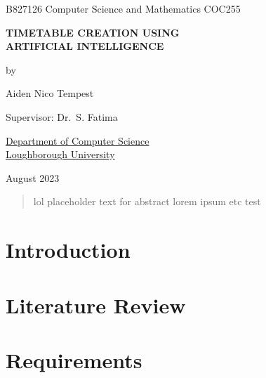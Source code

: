 \documentclass[a4paper, 12pt]{report}
\begin{document}
\graphicspath{{../doc-imgs/}}

\thispagestyle{empty}
\begin{center}
	\Large{
		B827126 \hfill Computer Science and Mathematics \hfill COC255
	}
	\vspace*{\fill}

	\Large{\textbf{TIMETABLE CREATION USING\\ARTIFICIAL INTELLIGENCE}}

	\vspace*{\fill}

	by

	\vspace*{\fill}

	Aiden Nico Tempest

	\vspace*{\fill}

	Supervisor: Dr.\ S. Fatima

	\vspace*{\fill}

	\underline{Department of Computer Science} \\ \underline{Loughborough
	University}

	\vspace*{\fill}
	
	August 2023

\end{center} %

\newpage

\restoregeometry

\begin{abstract} %
	lol placeholder text for abstract lorem ipsum etc test
\end{abstract}


\tableofcontents

\newpage

\chapter{Introduction} %

\chapter{Literature Review}


\chapter{Requirements}

\end{document}
